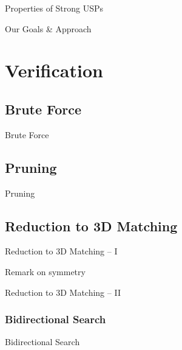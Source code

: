 \documentclass[t,10pt,
mathserif,xcolor=dvipsnames]{beamer}
\begin{document}
\begin{myframe}{Properties of Strong USPs}

\end{myframe}


\begin{myframe}{Our Goals \& Approach}

\end{myframe}

\section{Verification}


\subsection{Brute Force}

\begin{myframe}{Brute Force}

\end{myframe}

\subsection{Pruning}

\begin{myframe}{Pruning}

\end{myframe}

\subsection{Reduction to 3D Matching}

\begin{myframe}{Reduction to 3D Matching -- I}

Remark on symmetry
  
\end{myframe}

\begin{myframe}{Reduction to 3D Matching -- II}

\end{myframe}

\subsubsection{Bidirectional Search}

\begin{myframe}{Bidirectional Search}

\end{myframe}
\end{document}
